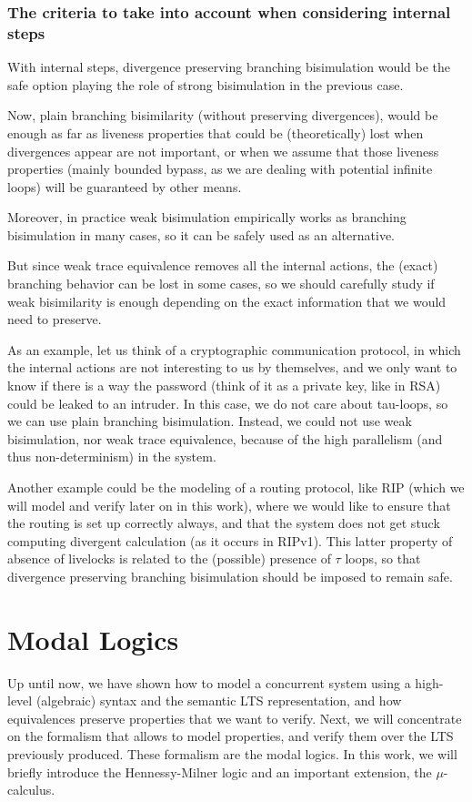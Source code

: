 \documentclass[11pt]{article}
\theoremstyle{definition}
\theoremstyle{plain}
\theoremstyle{definition}
\begin{document}
\subsubsection{The criteria to take into account when considering internal steps}

With internal steps, divergence preserving branching bisimulation would be the safe option playing the role of strong bisimulation in the previous case.

Now, plain branching bisimilarity (without preserving divergences), would be enough as far as liveness properties that could be (theoretically) lost when divergences appear are not important, or when we assume that those liveness properties (mainly bounded bypass, as we are dealing with potential infinite loops) will be guaranteed by other means.

Moreover, in practice weak bisimulation empirically works as branching bisimulation in many cases, so it can be safely used as an alternative.

But since weak trace equivalence removes all the internal actions, the (exact) branching behavior can be lost in some cases, so we should carefully study if weak bisimilarity is enough depending on the exact information that we would need to preserve.

As an example, let us think of a cryptographic communication protocol, in which the internal actions are not interesting to us by themselves, and we only want to know if there is a way the password (think of it as a private key, like in RSA) could be leaked to an intruder. In this case, we do not care about tau-loops, so we can use plain branching bisimulation. Instead, we could not use weak bisimulation, nor weak trace equivalence, because of the high parallelism (and thus non-determinism) in the system.

Another example could be the modeling of a routing protocol, like RIP (which we will model and verify later on in this work), where we would like to ensure that the routing is set up correctly always, and that the system does not get stuck computing divergent calculation (as it occurs in RIPv1). This latter property of absence of livelocks is related to the (possible) presence of $ \tau  $ loops, so that divergence preserving branching bisimulation should be imposed to remain safe.

\clearpage

\section{Modal Logics}
Up until now, we have shown how to model a concurrent system using a high-level (algebraic) syntax and the semantic LTS representation, and how equivalences preserve properties that we want to verify. Next, we will concentrate on the formalism that allows to model properties, and verify them over the LTS previously produced. These formalism are the modal logics. In this work, we will briefly introduce the Hennessy-Milner logic and an important extension, the $ \mu $-calculus.
\end{document}
